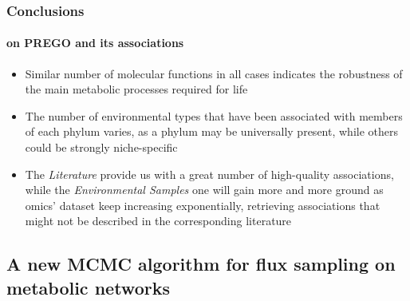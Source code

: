 \documentclass{beamer}
\begin{document}
   \begin{frame}
      \frametitle{Conclusions}
      \framesubtitle{on PREGO and its associations}

      \small
      \begin{itemize}
         \item Similar number of molecular functions in all cases indicates the robustness of the main
         metabolic processes required for life
         \item The number of environmental types that have been associated with members of each phylum varies, as a phylum may be universally present, while others could be
         strongly niche-specific
         \item The \textit{Literature} provide us with a great number of high-quality associations, while 
         the \textit{Environmental Samples} one will gain more and more ground as 
         omics' dataset keep increasing exponentially, retrieving associations that might not be described in the corresponding literature
      \end{itemize}
   \end{frame}



   \begin{darkframes}
      \section{
         A new MCMC algorithm for flux sampling on metabolic networks
      }   
   \end{darkframes}
\end{document}
